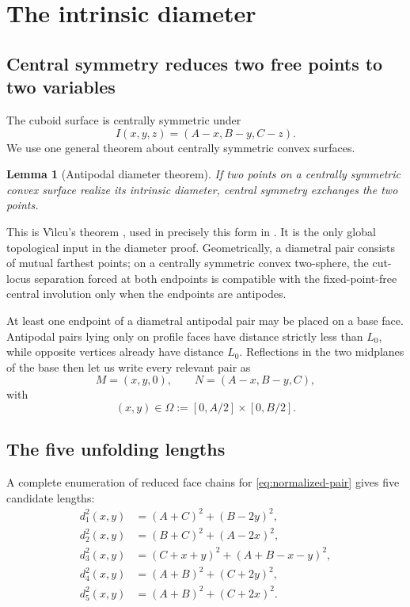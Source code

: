 \documentclass[11pt]{article}
\newtheorem{lemma}[theorem]{Lemma}
\theoremstyle{definition}
\begin{document}
\section{The intrinsic diameter}\label{sec:diam-proof}

\subsection{Central symmetry reduces two free points to two variables}

The cuboid surface is centrally symmetric under
\begin{equation}\label{eq:involution}
  I(x,y,z)=(A-x,B-y,C-z).
\end{equation}
We use one general theorem about centrally symmetric convex surfaces.

\begin{lemma}[Antipodal diameter theorem]\label{lem:antipodal}
If two points on a centrally symmetric convex surface realize its intrinsic
diameter, central symmetry exchanges the two points.
\end{lemma}

This is V\^{\i}lcu's theorem \cite{vilcu2000steinhaus}, used in precisely this
form in \cite{nikonorov2008diameter}.  It is the only global topological input
in the diameter proof.  Geometrically, a diametral pair consists of mutual
farthest points; on a centrally symmetric convex two-sphere, the cut-locus
separation forced at both endpoints is compatible with the fixed-point-free
central involution only when the endpoints are antipodes.

At least one endpoint of a diametral antipodal pair may be placed on a base
face.  Antipodal pairs lying only on profile faces have distance strictly less
than $L_0$, while opposite vertices already have distance $L_0$.  Reflections
in the two midplanes of the base then let us write every relevant pair as
\begin{equation}\label{eq:normalized-pair}
  M=(x,y,0),\qquad N=(A-x,B-y,C),
\end{equation}
with
\begin{equation}\label{eq:Omega}
  (x,y)\in\Omega:=[0,A/2]\times[0,B/2].
\end{equation}

\subsection{The five unfolding lengths}

A complete enumeration of reduced face chains for \eqref{eq:normalized-pair}
gives five candidate lengths:
\begin{align}
 d_1^2(x,y)&=(A+C)^2+(B-2y)^2,\label{eq:d1}\\
 d_2^2(x,y)&=(B+C)^2+(A-2x)^2,\label{eq:d2}\\
 d_3^2(x,y)&=(C+x+y)^2+(A+B-x-y)^2,\label{eq:d3}\\
 d_4^2(x,y)&=(A+B)^2+(C+2y)^2,\label{eq:d4}\\
 d_5^2(x,y)&=(A+B)^2+(C+2x)^2.\label{eq:d5}
\end{align}
\end{document}
